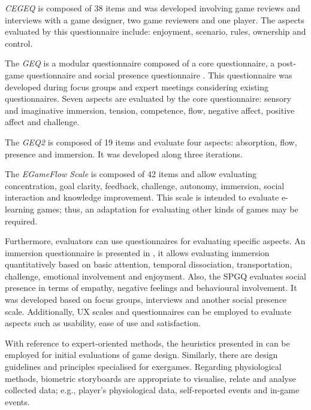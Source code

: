 \textit{\ac{CEGEQ}} \autocite{Calvillo-Gamez2015} is composed of 38 items and was developed involving game reviews and interviews with a game designer, two game reviewers and one player. The aspects evaluated by this questionnaire include: enjoyment, scenario, rules, ownership and control.

The \textit{\ac{GEQ}} is a modular questionnaire composed of a core questionnaire, a post-game questionnaire and social presence questionnaire \autocite{Poels2008}. This questionnaire was developed during focus groups and expert meetings considering existing questionnaires. Seven aspects are evaluated by the core questionnaire: sensory and imaginative immersion, tension, competence, flow, negative affect, positive affect and challenge.

The \textit{\ac{GEQ2}} \autocite{Brockmyer2009} is composed of 19 items and evaluate four aspects: absorption, flow, presence and immersion. It was developed along three iterations.

The \textit{EGameFlow Scale} \autocite{Fu2009} is composed of 42 items and allow evaluating concentration, goal clarity, feedback, challenge, autonomy, immersion, social interaction and knowledge improvement. This scale is intended to evaluate e-learning games; thus, an adaptation for evaluating other kinds of games may be required.

Furthermore, evaluators can use questionnaires for evaluating specific aspects. An immersion questionnaire is presented in \autocite{jennett2008measuring}, it allows evaluating immersion quantitatively based on basic attention, temporal dissociation, transportation, challenge, emotional involvement and enjoyment. Also, the \ac{SPGQ} \autocite{DeKort2007} evaluates social presence in terms of empathy, negative feelings and behavioural involvement. It was developed based on focus groups, interviews and another social presence scale. Additionally, \ac{UX} scales \autocite{Brooke1996} and questionnaires \autocite{Laugwitz2008,Hassenzahl2003,lund2001measuring} can be employed to evaluate aspects such as usability, ease of use and satisfaction.

With reference to expert-oriented methods, the heuristics presented in \autocite{Desurvire2009,Federoff2002,Tondello2016} can be employed for initial evaluations of game design. Similarly, there are design guidelines \autocite{Wiemeyer2015,Isbister2015,Mueller2014} and principles \autocite{Berkovsky2010} specialised for exergames. Regarding physiological methods, biometric storyboards \autocite{Mirza-Babaei2014} are appropriate to visualise, relate and analyse collected data; e.g., player's physiological data, self-reported events and in-game events.

